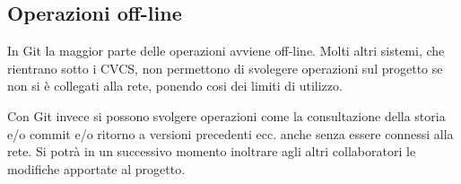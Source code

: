 \subsection{Operazioni off-line}
In Git la maggior parte delle operazioni avviene off-line. Molti altri sistemi, che rientrano sotto i CVCS, non permettono di svolegere operazioni sul progetto se non si è collegati alla rete, ponendo cosi dei limiti di utilizzo.

Con Git invece si possono svolgere operazioni come la consultazione della storia e/o commit e/o ritorno a versioni precedenti ecc. anche senza essere connessi alla rete. Si potrà in un successivo momento inoltrare agli altri collaboratori le modifiche apportate al progetto.

